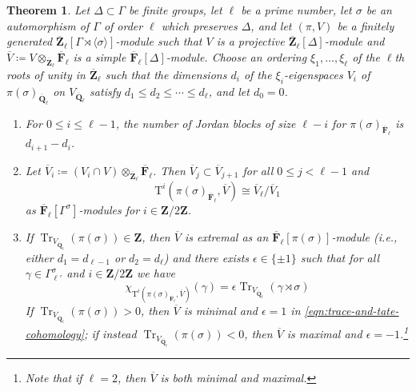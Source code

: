 \documentclass[reqno]{amsart}
\numberwithin{equation}{subsection}
\newcommand{\F}{\mathbf{F}}
\newcommand{\Q}{\mathbf{Q}}
\newcommand{\Z}{\mathbf{Z}}
\newcommand{\ol}[1]{\overline{#1}}
\DeclareMathOperator{\Tr}{Tr}
\newcommand{\rT}{\ensuremath{\mathrm{T}}\xspace}
\newtheorem{thm}{Theorem}[subsection]
\theoremstyle{remark}
\numberwithin{equation}{subsection}
\numberwithin{figure}{subsection}
\begin{document}
\begin{thm}\label{theorem:eigenvalues-and-jordan-blocks}
    Let $\Delta \subset \Gamma$ be finite groups, let $\ell$ be a prime number, let $\sigma$ be an automorphism of $\Gamma$ of order $\ell$ which preserves $\Delta$, and let $(\pi, V)$ be a finitely generated $\ol\Z_\ell[\Gamma \rtimes \langle\sigma\rangle]$-module such that $V$ is a projective $\ol\Z_\ell[\Delta]$-module and $\ol V \coloneqq V \otimes_{\ol\Z_\ell} \ol\F_\ell$ is a simple $\ol\F_\ell[\Delta]$-module. Choose an ordering $\xi_1, \dots, \xi_\ell$ of the $\ell$th roots of unity in $\ol\Z_\ell$ such that the dimensions $d_i$ of the $\xi_i$-eigenspaces $V_i$ of $\pi(\sigma)_{\ol\Q_\ell}$ on $V_{\ol\Q_\ell}$ satisfy $d_1 \leq d_2 \leq \cdots \leq d_\ell$, and let $d_0 = 0$.
    \begin{enumerate}
        \item For $0 \leq i \leq \ell - 1$, the number of Jordan blocks of size $\ell - i$ for $\pi(\sigma)_{\ol\F_\ell}$ is $d_{i+1} - d_i$.
        \item Let $\ol V_i \coloneqq (V_i \cap V)\otimes_{\ol \Z_\ell} \ol \F_\ell$. Then $\ol V_j \subset \ol V_{j+1}$ for all $0 \leq j < \ell - 1$ and
        \begin{equation}\label{eq:glauberman-theorem-2}
        \rT^i(\pi(\sigma)_{\ol\F_\ell}, \ol V) \cong \ol V_\ell/\ol V_1
        \end{equation}
        as $\ol\F_\ell[\Gamma^\sigma]$-modules for $i \in \Z/2\Z$.
        \item If $\Tr_{V_{\ol\Q_\ell}}(\pi(\sigma)) \in \Z$, then $\ol V$ is extremal as an $\ol\F_\ell[\pi(\sigma)]$-module (i.e., either $d_1 = d_{\ell-1}$ or $d_2 = d_\ell$) and there exists $\epsilon \in \{\pm 1\}$ such that for all $\gamma \in \Gamma^\sigma_{\ell'}$ and $i \in \Z/2\Z$ we have
        \begin{equation}\label{eqn:trace-and-tate-cohomology}
        \chi_{\rT^i(\pi(\sigma)_{\ol\F_\ell}, \ol V)}(\gamma) = \epsilon \Tr_{V_{\ol\Q_\ell}}(\gamma \rtimes \sigma)
        \end{equation}
        If $\Tr_{V_{\ol\Q_\ell}}(\pi(\sigma)) > 0$, then $\ol V$ is minimal and $\epsilon = 1$ in \eqref{eqn:trace-and-tate-cohomology}; if instead $\Tr_{V_{\ol\Q_\ell}}(\pi(\sigma)) < 0$, then $\ol V$ is maximal and $\epsilon = -1$.\footnote{Note that if $\ell = 2$, then $\ol V$ is both minimal and maximal.}
    \end{enumerate}
\end{thm}
\end{document}
